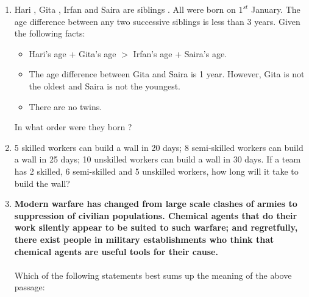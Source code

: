 \documentclass[journal,12pt,onecolumn]{IEEEtran}
\theoremstyle{remark}
\begin{document}
\begin{enumerate}
\newpage

\item Hari , Gita , Irfan  and Saira  are siblings . All were born on $1^{st}$ January. The age difference between any two successive siblings  is less than 3 years. Given the following facts:

\begin{itemize}
    \item Hari's age + Gita's age $>$ Irfan's age + Saira's age.
    \item The age difference between Gita and Saira is 1 year. However, Gita is not the oldest and Saira is not the youngest.
    \item There are no twins. 
\end{itemize}

In what order were they born ?

\hfill{}
\begin{enumerate}
 \end{enumerate}

\item 5 skilled workers can build a wall in 20 days; 8 semi-skilled workers can build a wall in 25 days; 10 unskilled workers can build a wall in 30 days. If a team has 2 skilled, 6 semi-skilled and 5 unskilled workers, how long will it take to build the wall?
\hfill{}\begin{enumerate}  \end{enumerate}



\item \textbf{Modern warfare has changed from large scale clashes of armies to suppression of civilian populations. Chemical agents that do their work silently appear to be suited to such warfare; and regretfully, there exist people in military establishments who think that chemical agents are useful tools for their cause.} \\ \\
Which of the following statements best sums up the meaning of the above passage:


\end{enumerate}
\end{document}
